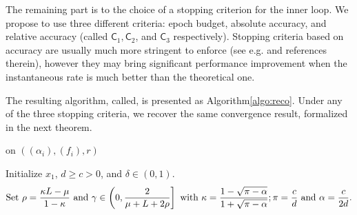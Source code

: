 The remaining part is to the choice of a stopping criterion for the inner loop. We propose to use three different criteria: epoch budget, absolute accuracy, and relative accuracy (called $\mathsf{C}_1, \mathsf{C}_2$, and $\mathsf{C}_3$ respectively). Stopping criteria based on accuracy are usually much more stringent to enforce (see e.g. \cite[Sec.~2.3]{lin2017catalyst} and references therein), however they may bring significant performance improvement when the instantaneous rate is much better than the theoretical one. 

The resulting algorithm, called\;\recoalgo, is presented as Algorithm\;\ref{algo:reco}. Under any of the three stopping criteria, we recover the same convergence result, formalized in the next theorem.

\begin{algorithm}[]
\caption{\label{algo:reco}\recoalgo on $((\alpha_i),(f_i),r)$}
Initialize $x_1$, $d\geq c>0$, and $\delta\in(0,1)$.
\begin{align}
\label{eq:set}
 \text{Set } \rho = \frac{\kappa L-\mu}{1-\kappa} \text{ and } \gamma \in \left( 0, \frac{2}{\mu+L+2\rho} \right] \text{ with } \kappa = \frac{1-\sqrt{\pi -\alpha}}{1+\sqrt{\pi-\alpha}}; \pi = \frac{c}{d} \text{ and } \alpha = \frac{c}{2d}.
\end{align}
\end{algorithm}
